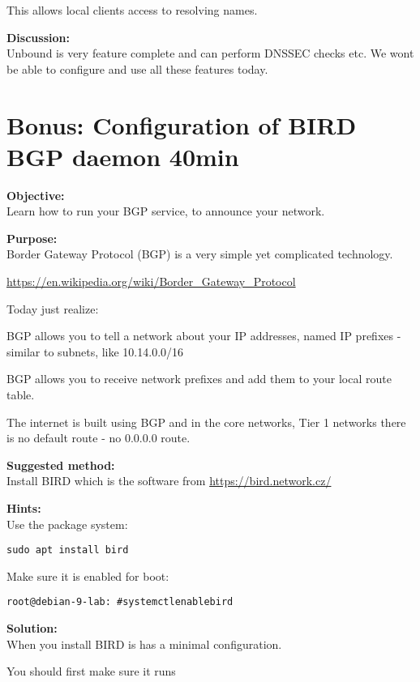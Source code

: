 \documentclass[a4paper,11pt,notitlepage]{report}
\begin{document}
This allows local clients access to resolving names.

{\bf Discussion:}\\
Unbound is very feature complete and can perform DNSSEC checks etc. We wont be able to configure and use all these features today.



\chapter{Bonus: Configuration of BIRD BGP daemon 40min}
\label{ex:bgp-config}


{\bf Objective:}\\
Learn how to run your BGP service, to announce your network.

{\bf Purpose:}\\
Border Gateway Protocol (BGP) is a very simple yet complicated technology.

\url{https://en.wikipedia.org/wiki/Border_Gateway_Protocol}

Today just realize:
\begin{list2}
\item BGP allows you to tell a network about your IP addresses, named IP prefixes - similar to subnets, like 10.14.0.0/16
\item BGP allows you to receive network prefixes and add them to your local route table.
\end{list2}

The internet is built using BGP and in the core networks, Tier 1 networks there is no default route - no 0.0.0.0 route.



{\bf Suggested method:}\\
Install BIRD which is the software from \url{https://bird.network.cz/}

{\bf Hints:}\\
Use the package system:

\verb+sudo apt install bird+

Make sure it is enabled for boot:

\begin{alltt}\footnotesize
root@debian-9-lab:~# systemctl enable bird
\end{alltt}

{\bf Solution:}\\
When you install BIRD is has a minimal configuration.

You should first make sure it runs
\end{document}
